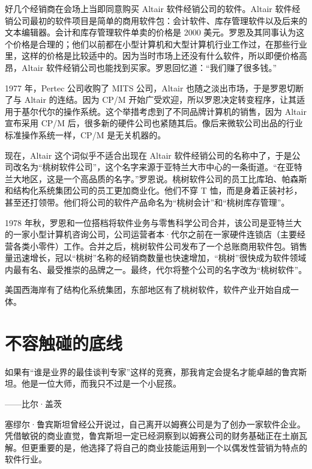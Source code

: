 \documentclass[12pt,UTF8]{ctexbook}
\begin{document}
好几个经销商在会场上当即同意购买 Altair 软件经销公司的软件。Altair 软件经销公司最初的软件项目是简单的商用软件包：会计软件、库存管理软件以及后来的文本编辑器。会计和库存管理软件单卖的价格是 2000 美元。罗恩及其同事认为这个价格是合理的；他们以前都在小型计算机和大型计算机行业工作过，在那些行业里，这样的价格是比较适中的。因为当时市场上还没有什么软件，所以即便价格高昂，Altair 软件经销公司也能找到买家。罗恩回忆道：“我们赚了很多钱。”

1977 年，Pertec 公司收购了 MITS 公司，Altair 也随之淡出市场，于是罗恩切断了与 Altair 的连结。因为 CP/M 开始广受欢迎，所以罗恩决定转变程序，让其适用于基尔代尔的操作系统。这个举措考虑到了不同品牌计算机的销售，因为 Altair 宣布采用 CP/M 后，很多新的硬件公司也紧随其后。像后来微软公司出品的行业标准操作系统一样，CP/M 是无关机器的。

现在，Altair 这个词似乎不适合出现在 Altair 软件经销公司的名称中了，于是公司改名为“桃树软件公司”，这个名字来源于亚特兰大市中心的一条街道。“在亚特兰大地区，这是一个高品质的名字。”罗恩说。桃树软件公司的员工比库珀、帕森斯和结构化系统集团公司的员工更加商业化。他们不穿 T 恤，而是身着正装衬衫，甚至还打领带。他们将公司的软件产品命名为“桃树会计”和“桃树库存管理”。

1978 年秋，罗恩和一位搭档将软件业务与零售科学公司合并，该公司是亚特兰大的一家小型计算机咨询公司，公司运营者本·代尔之前在一家硬件连锁店（主要经营各类小零件）工作。合并之后，桃树软件公司发布了一个总账商用软件包。销售量迅速增长，冠以“桃树”名称的经销商数量也快速增加，“桃树”很快成为软件领域内最有名、最受推崇的品牌之一。最终，代尔将整个公司的名字改为“桃树软件”。

美国西海岸有了结构化系统集团，东部地区有了桃树软件，软件产业开始自成一体。





\section{不容触碰的底线}


如果有“谁是业界的最佳谈判专家”这样的竞赛，那我肯定会提名才能卓越的鲁宾斯坦。他是一位大师，而我只不过是一个小屁孩。

——比尔·盖茨



塞缪尔·鲁宾斯坦曾经公开说过，自己离开以姆赛公司是为了创办一家软件企业。凭借敏锐的商业直觉，鲁宾斯坦一定已经洞察到以姆赛公司的财务基础正在土崩瓦解。但更重要的是，他选择了将自己的商业技能运用到一个以偶发性营销为特点的软件行业。
\end{document}
